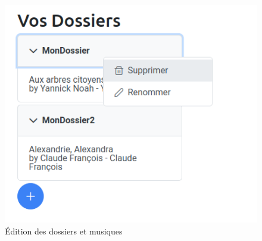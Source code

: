 \documentclass[12pt,french]{article}
\begin{document}
\begin{figure}[H]
\begin{minipage}{.3\textwidth}
	\end{minipage}
\begin{minipage}{.3\textwidth}
	\centering
	\includegraphics[scale=0.4]{dossier5.png}
\end{minipage}
	\caption{Édition des dossiers et musiques}    
\end{figure}
\end{document}
